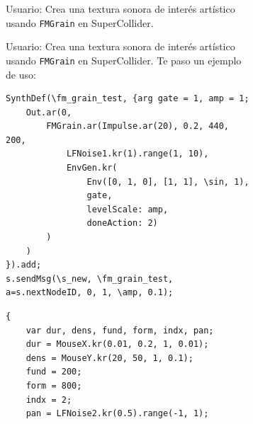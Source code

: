 \begin{figure}%
    \caption[]{Comparación de resultados de ChatGPT con (a) \textit{Zero-shot} y (b) \textit{Few-shot}.}
    \centering
    \begin{subfigure}{.48\textwidth}
      \centering
      \begin{mdframed}
        \fontsize{9.5pt}{11pt}\selectfont
        Usuario: Crea una textura sonora de interés artístico usando \texttt{FMGrain} en SuperCollider.
      \end{mdframed}
    \end{subfigure}\hfill
    \begin{subfigure}{.48\textwidth}
      \centering
      \begin{mdframed}
        \fontsize{9.5pt}{11pt}\selectfont
        Usuario: Crea una textura sonora de interés artístico usando \texttt{FMGrain} en SuperCollider. Te paso un ejemplo de uso:
        \begin{lstlisting}[style=SuperCollider-IDE, basicstyle=\footnotesize\ttfamily, numbers=none]
SynthDef(\fm_grain_test, {arg gate = 1, amp = 1;
    Out.ar(0,
        FMGrain.ar(Impulse.ar(20), 0.2, 440, 200,
            LFNoise1.kr(1).range(1, 10),
            EnvGen.kr(
                Env([0, 1, 0], [1, 1], \sin, 1),
                gate,
                levelScale: amp,
                doneAction: 2)
        )
    )
}).add;
s.sendMsg(\s_new, \fm_grain_test, a=s.nextNodeID, 0, 1, \amp, 0.1);
        \end{lstlisting}
      \end{mdframed}
    \end{subfigure}

    \vspace{0.2cm}

    \begin{subfigure}{.48\textwidth}
        \centering
        \begin{lstlisting}[style=SuperCollider-IDE, basicstyle=\footnotesize\ttfamily, numbers=none]
{
    var dur, dens, fund, form, indx, pan;
    dur = MouseX.kr(0.01, 0.2, 1, 0.01); 
    dens = MouseY.kr(20, 50, 1, 0.1);
    fund = 200;                     
    form = 800;
    indx = 2;
    pan = LFNoise2.kr(0.5).range(-1, 1); 


\end{lstlisting}
\end{subfigure}
\end{figure}
